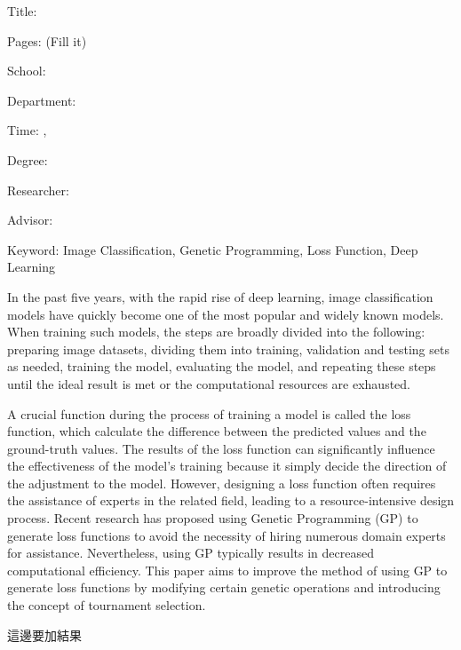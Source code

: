 \begin{EnAbstract}
    \begin{EnAbstractItems}
        \noindent \text Title: \eTitle

        \noindent \text Pages: (Fill it)

        \noindent \text School: \univEname

        \noindent \text Department: \deptEname

        \noindent \text Time: \eMonth, \eYear

        \noindent \text Degree: \degreeEname

        \noindent \text Researcher: \myEname

        \noindent \text Advisor: \advisorEname

        \noindent \text Keyword: Image Classification, Genetic Programming, Loss Function, Deep Learning

    \end{EnAbstractItems}

    \begin{EnAbstractDescription}
        In the past five years, with the rapid rise of deep learning, image classification models have quickly become one of the most popular and widely known models. When training such models, the steps are broadly divided into the following: preparing image datasets, dividing them into training, validation and testing sets as needed, training the model, evaluating the model, and repeating these steps until the ideal result is met or the computational resources are exhausted.

        A crucial function during the process of training a model is called the loss function, which calculate the difference between the predicted values and the ground-truth values. The results of the loss function can significantly influence the effectiveness of the model's training because it simply decide the direction of the adjustment to the model. However, designing a loss function often requires the assistance of experts in the related field, leading to a resource-intensive design process. Recent research has proposed using Genetic Programming (GP) to generate loss functions to avoid the necessity of hiring numerous domain experts for assistance. Nevertheless, using GP typically results in decreased computational efficiency. This paper aims to improve the method of using GP to generate loss functions by modifying certain genetic operations and introducing the concept of tournament selection.

        這邊要加結果
    \end{EnAbstractDescription}

\end{EnAbstract}

